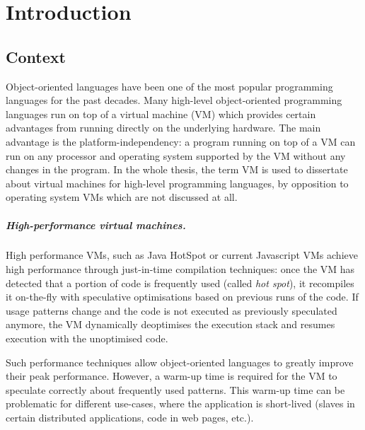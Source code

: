 \documentclass[a4paper,12pt,twoside]{../includes/ThesisStyle}
\begin{document}
\fi

\chapter{Introduction}
\label{chap:intro}
\minitoc

\section{Context}

Object-oriented languages have been one of the most popular programming languages for the past decades. Many high-level object-oriented programming languages run on top of a virtual machine (VM) which provides certain advantages from running directly on the underlying hardware. The main advantage is the platform-independency: a program running on top of a VM can run on any processor and operating system supported by the VM without any changes in the program. In the whole thesis, the term VM is used to dissertate about virtual machines for high-level programming languages, by opposition to operating system VMs which are not discussed at all.

\paragraph{High-performance virtual machines.}
High performance VMs, such as Java HotSpot or current Javascript VMs achieve high performance through just-in-time compilation techniques: once the VM has detected that a portion of code is frequently used (called \emph{hot spot}), it recompiles it on-the-fly with speculative optimisations based on previous runs of the code. If usage patterns change and the code is not executed as previously speculated anymore, the VM dynamically deoptimises the execution stack and resumes execution with the unoptimised code.

Such performance techniques allow object-oriented languages to greatly improve their peak performance. However, a warm-up time is required for the VM to speculate correctly about frequently used patterns. This warm-up time can be problematic for different use-cases, where the application is short-lived (slaves in certain distributed applications, code in web pages, etc.).
\end{document}
